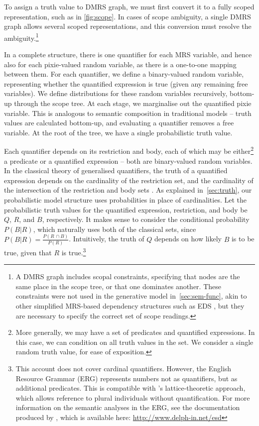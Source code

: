\documentclass[a4paper,11pt]{article}
\begin{document}
To assign a truth value to DMRS graph,
we must first convert it to a fully scoped representation,
such as in \cref{fig:scope}.
In cases of scope ambiguity,
a single DMRS graph allows several scoped representations,
and this conversion must resolve the ambiguity.\footnote{%
	A DMRS graph includes scopal constraints,
	specifying that nodes are the same place in the scope tree,
	or that one dominates another.
	These constraints were not used in the generative model in~\cref{sec:sem-func},
	akin to other simplified MRS-based dependency structures such as EDS \citep{oepen2006eds},
	but they are necessary to specify the correct set of scope readings.
}

In a complete structure, there is one quantifier for each MRS variable,
and hence also for each pixie-valued random variable, as there is a one-to-one mapping between them.
For each quantifier, we define a binary-valued random variable,
representing whether the quantified expression is true (given any remaining free variables).
We define distributions for these random variables recursively,
bottom-up through the scope tree.
At each stage, we marginalise out the quantified pixie variable.
This is analogous to semantic composition in traditional models --
truth values are calculated bottom-up,
and evaluating a quantifier removes a free variable.
At the root of the tree, we have a single probabilistic truth value.

Each quantifier depends on its restriction and body,
each of which may be either\footnote{%
	More generally, we may have a set of predicates and quantified expressions.
	In this case, we can condition on all truth values in the set.
	We consider a single random truth value, for ease of exposition.
}
a predicate or a quantified expression --
both are binary-valued random variables.
In the classical theory of generalised quantifiers,
the truth of a quantified expression depends on
the cardinality of the restriction set, and
the cardinality of the intersection of the restriction and body sets
\citep{barwise1981quant,vanbenthem1984quant}.
As explained in~\cref{sec:truth},
our probabilistic model structure uses probabilities in place of cardinalities.
Let the probabilistic truth values for the quantified expression, restriction, and body
be $Q$, $R$, and $B$, respectively.
It makes sense to consider the conditional probability $P(B|R)$,
which naturally uses both of the classical sets, since
${P(B|R) = \frac{P(R\,\cap B)}{P(R)}}$.
Intuitively, the truth of $Q$ depends on how likely $B$ is to be true, given that $R$ is true.\footnote{%
	This account does not cover cardinal quantifiers.
	However, the English Resource Grammar (ERG) represents numbers not as quantifiers, but as additional predicates.
	This is compatible with \citet{link2002plural}'s lattice-theoretic approach,
	which allows reference to plural individuals without quantification.
	For more information on the semantic analyses in the ERG,
	see the documentation produced by \citet{flickinger2014ers},
	which is available here: \url{http://www.delph-in.net/esd}
}
\end{document}
